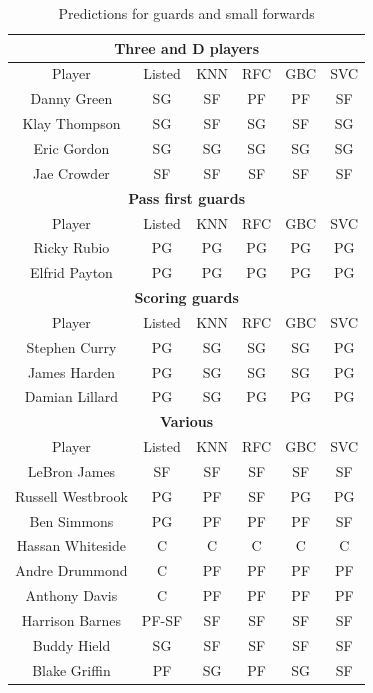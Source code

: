 \documentclass[a4paper]{article}
\begin{document}
\begin{table}[!h]
\begin{center}
\begin{tabular}{|c|c|c|c|c|c|} \hline
\multicolumn{6}{|c|}{\textbf{Three and D players}} \\ \hline
Player & Listed & KNN & RFC & GBC & SVC \\ \hline
Danny Green & SG & SF & PF & PF & SF \\ \hline
Klay Thompson & SG & SF & SG & SF & SG  \\ \hline
Eric Gordon & SG & SG & SG & SG & SG  \\ \hline
Jae Crowder & SF & SF & SF & SF & SF  \\ \hline
\multicolumn{6}{|c|}{\textbf{Pass first guards}} \\ \hline
Player & Listed & KNN & RFC & GBC & SVC \\ \hline
Ricky Rubio & PG & PG & PG & PG & PG \\ \hline
Elfrid Payton & PG & PG & PG & PG & PG \\ \hline
\multicolumn{6}{|c|}{\textbf{Scoring guards}} \\ \hline
Player & Listed & KNN & RFC & GBC & SVC \\ \hline
Stephen Curry & PG & SG & SG & SG & PG  \\ \hline
James Harden & PG & SG & SG & SG & PG \\ \hline
Damian Lillard & PG & SG & PG & PG & PG \\ \hline
\multicolumn{6}{|c|}{\textbf{Various}} \\ \hline
Player & Listed & KNN & RFC & GBC & SVC \\ \hline
LeBron James & SF & SF & SF & SF & SF \\ \hline
Russell Westbrook & PG & PF & SF & PG & PG \\ \hline
Ben Simmons & PG & PF & PF & PF & SF \\ \hline
Hassan Whiteside & C & C & C & C & C \\ \hline
Andre Drummond & C & PF & PF & PF & PF \\ \hline
Anthony Davis & C & PF & PF & PF & PF \\ \hline
Harrison Barnes & PF-SF & SF & SF & SF & SF \\ \hline
Buddy Hield & SG & SF & SF & SF & SF \\ \hline
Blake Griffin & PF & SG & PF & SG & SF \\ \hline
\end{tabular}
\caption{Predictions for guards and small forwards}
\label{tab:pos_clf_pg_sg_sf_predictions}
\end{center}
\end{table}
\end{document}
